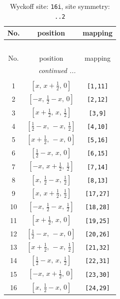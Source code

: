 \documentclass[fleqn,8pt]{jsarticle}
\begin{document}
\begin{longtable}{ccc}
\caption{Wyckoff site: {\tt 16i}, site symmetry: {\tt ..2}}
 \\
 \hline \hline
No. & position & mapping \\ \hline \endfirsthead

\multicolumn{2}{l}{\tablename\ \thetable{}} \\
 \hline \hline
No. & position & mapping \\ \hline \endhead

 \hline \hline
\multicolumn{2}{r}{\footnotesize\it continued ...} \\ \endfoot

 \hline \hline
\multicolumn{2}{r}{} \\ \endlastfoot

1 & $\left[ x,\, x + \frac{1}{2},\, 0 \right]$ & {\tt [1,11]} \\ \hline
2 & $\left[ - x,\, \frac{1}{2} - x,\, 0 \right]$ & {\tt [2,12]} \\ \hline
3 & $\left[ x + \frac{1}{2},\, x,\, \frac{1}{2} \right]$ & {\tt [3,9]} \\ \hline
4 & $\left[ \frac{1}{2} - x,\, - x,\, \frac{1}{2} \right]$ & {\tt [4,10]} \\ \hline
5 & $\left[ x + \frac{1}{2},\, - x,\, 0 \right]$ & {\tt [5,16]} \\ \hline
6 & $\left[ \frac{1}{2} - x,\, x,\, 0 \right]$ & {\tt [6,15]} \\ \hline
7 & $\left[ - x,\, x + \frac{1}{2},\, \frac{1}{2} \right]$ & {\tt [7,14]} \\ \hline
8 & $\left[ x,\, \frac{1}{2} - x,\, \frac{1}{2} \right]$ & {\tt [8,13]} \\ \hline
9 & $\left[ x,\, x + \frac{1}{2},\, \frac{1}{2} \right]$ & {\tt [17,27]} \\ \hline
10 & $\left[ - x,\, \frac{1}{2} - x,\, \frac{1}{2} \right]$ & {\tt [18,28]} \\ \hline
11 & $\left[ x + \frac{1}{2},\, x,\, 0 \right]$ & {\tt [19,25]} \\ \hline
12 & $\left[ \frac{1}{2} - x,\, - x,\, 0 \right]$ & {\tt [20,26]} \\ \hline
13 & $\left[ x + \frac{1}{2},\, - x,\, \frac{1}{2} \right]$ & {\tt [21,32]} \\ \hline
14 & $\left[ \frac{1}{2} - x,\, x,\, \frac{1}{2} \right]$ & {\tt [22,31]} \\ \hline
15 & $\left[ - x,\, x + \frac{1}{2},\, 0 \right]$ & {\tt [23,30]} \\ \hline
16 & $\left[ x,\, \frac{1}{2} - x,\, 0 \right]$ & {\tt [24,29]} \\
\end{longtable}
\end{document}
